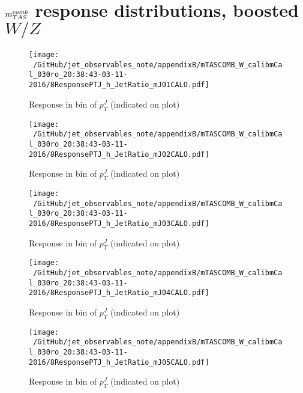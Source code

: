 \clearpage
\onecolumn
\vspace*{\fill}
\section{$m^{comb}_{TAS}$ response distributions, boosted $W/Z$}
\vfill
\clearpage
\twocolumn
 \clearpage %
\begin{figure}

\texttt{[image: ~/GitHub/jet\_observables\_note/appendixB/mTASCOMB\_W\_calibmCal\_030ro\_20:38:43-03-11-2016/8ResponsePTJ\_h\_JetRatio\_mJ01CALO.pdf]}
\caption{Response in bin of  $p_{T}^{J}$ (indicated on plot)} 

\end{figure}

\begin{figure}

\texttt{[image: ~/GitHub/jet\_observables\_note/appendixB/mTASCOMB\_W\_calibmCal\_030ro\_20:38:43-03-11-2016/8ResponsePTJ\_h\_JetRatio\_mJ02CALO.pdf]}
\caption{Response in bin of  $p_{T}^{J}$ (indicated on plot)} 

\end{figure}

\begin{figure}

\texttt{[image: ~/GitHub/jet\_observables\_note/appendixB/mTASCOMB\_W\_calibmCal\_030ro\_20:38:43-03-11-2016/8ResponsePTJ\_h\_JetRatio\_mJ03CALO.pdf]}
\caption{Response in bin of  $p_{T}^{J}$ (indicated on plot)} 

\end{figure}

\begin{figure}

\texttt{[image: ~/GitHub/jet\_observables\_note/appendixB/mTASCOMB\_W\_calibmCal\_030ro\_20:38:43-03-11-2016/8ResponsePTJ\_h\_JetRatio\_mJ04CALO.pdf]}
\caption{Response in bin of  $p_{T}^{J}$ (indicated on plot)} 

\end{figure}

\begin{figure}

\texttt{[image: ~/GitHub/jet\_observables\_note/appendixB/mTASCOMB\_W\_calibmCal\_030ro\_20:38:43-03-11-2016/8ResponsePTJ\_h\_JetRatio\_mJ05CALO.pdf]}
\caption{Response in bin of  $p_{T}^{J}$ (indicated on plot)} 

\end{figure}

